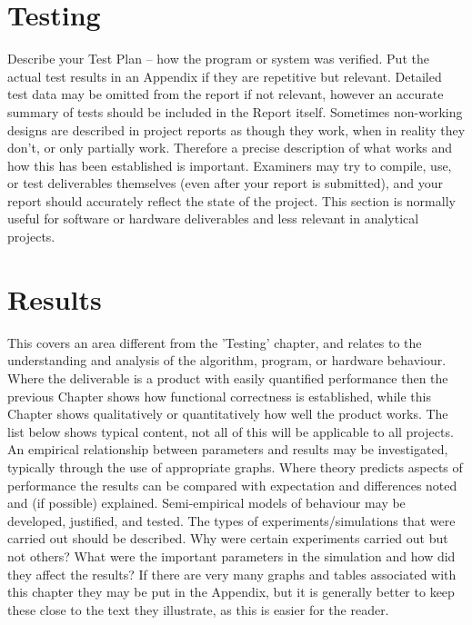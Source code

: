 \documentclass[10pt,onecolumn,letterpaper]{article}
\begin{document}

\section{Testing}

Describe your Test Plan -- how the program or system
was verified. Put the actual test results in an Appendix
if they are repetitive but relevant. Detailed test data
may be omitted from the report if not relevant,
however an accurate summary of tests should be
included in the Report itself. Sometimes non-working
designs are described in project reports as though
they work, when in reality they don’t, or only partially
work. Therefore a precise description of what works
and how this has been established is important.
Examiners may try to compile, use, or test
deliverables themselves (even after your report is
submitted), and your report should accurately reflect
the state of the project.
This section is normally useful for software or
hardware deliverables and less relevant in analytical
projects.


\section{Results}

This covers an area different from the 'Testing'
chapter, and relates to the understanding and analysis
of the algorithm, program, or hardware behaviour.
Where the deliverable is a product with easily
quantified performance then the previous Chapter
shows how functional correctness is established,
while this Chapter shows qualitatively or
quantitatively how well the product works. The list
below shows typical content, not all of this will be
applicable to all projects.
An empirical relationship between
parameters and results may be investigated,
typically through the use of appropriate
graphs.
Where theory predicts aspects of
performance the results can be compared
with expectation and differences noted and (if
possible) explained.
Semi-empirical models of behaviour may be
developed, justified, and tested.
The types of experiments/simulations that
were carried out should be described. Why
were certain experiments carried out but not
others? What were the important parameters
in the simulation and how did they affect the
results? If there are very many graphs and
tables associated with this chapter they may
be put in the Appendix, but it is generally
better to keep these close to the text they
illustrate, as this is easier for the reader.
\end{document}
